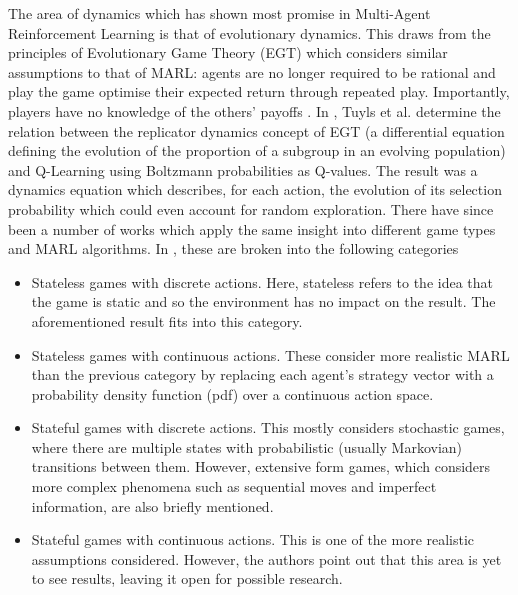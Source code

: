 \documentclass[.../main.tex]{subfiles}
\begin{document}
The area of dynamics which has shown most promise in Multi-Agent
Reinforcement Learning is that of evolutionary dynamics. This draws
from the principles of Evolutionary Game Theory (EGT) which considers
similar assumptions to that of MARL: agents are no longer required to
be rational and play the game optimise their expected return through
repeated play. Importantly, players have no knowledge of the others'
payoffs \cite{Tuyls2006AnGames}. In \cite{Tuyls2006AnGames}, Tuyls et
al.  determine the relation between the replicator dynamics concept of
EGT (a differential equation defining the evolution of the proportion
of a subgroup in an evolving population) and Q-Learning using
Boltzmann probabilities as Q-values. The result was a dynamics
equation which describes, for each action, the evolution of its
selection probability which could even account for random
exploration. There have since been a number of works which apply the
same insight into different game types and MARL algorithms. In
\cite{Bloembergen2015}, these are broken into the following categories

\begin{itemize}
    \item Stateless games with discrete actions. Here, stateless refers to the idea that the game is
    static and so the environment has no impact on the result. The aforementioned result 
    \cite{Tuyls2006AnGames} fits into this category.
    \item Stateless games with continuous actions. These consider more realistic MARL than the
    previous category by replacing each agent's strategy vector with a probability density function 
    (pdf) over a continuous action space.
    \item Stateful games with discrete actions. This mostly considers stochastic games, where there
    are multiple states with probabilistic (usually Markovian) transitions between them. However,
    extensive form games, which considers more complex phenomena such as sequential moves and
    imperfect information, are also briefly mentioned.
    \item Stateful games with continuous actions. This is one of the more realistic assumptions
    considered. However, the authors point out that this area is yet to see results, leaving it open
    for possible research.
\end{itemize}
\end{document}
